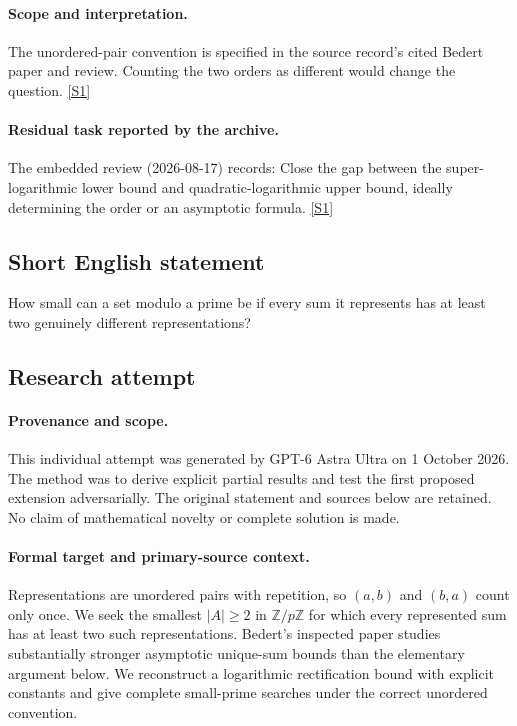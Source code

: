 \documentclass[11pt,a4paper]{article}
\newcommand{\Z}{\mathbb{Z}}
\newcommand{\sref}[2]{\hyperlink{source:#1:#2}{[S#2]}}
\begin{document}
\paragraph{Scope and interpretation.}

The unordered-pair convention is specified in the source record’s cited Bedert paper and review. Counting the two orders as different would change the question. \sref{158}{1}

\paragraph{Residual task reported by the archive.}

The embedded review (2026-08-17) records: Close the gap between the super-logarithmic lower bound and quadratic-logarithmic upper bound, ideally determining the order or an asymptotic formula. \sref{158}{1}

\subsection{Short English statement}

How small can a set modulo a prime be if every sum it represents has at least two genuinely different representations?

\subsection{Research attempt}

\paragraph{Provenance and scope.}
This individual attempt was generated by GPT-6 Astra Ultra on 1 October 2026. The method was to derive explicit partial results and test the first proposed extension adversarially. The original statement and sources below are retained. No claim of mathematical novelty or complete solution is made.

\paragraph{Formal target and primary-source context.}
Representations are unordered pairs with repetition, so $(a,b)$ and $(b,a)$ count only once. We seek the smallest $|A|\geq2$ in $\Z/p\Z$ for which every represented sum has at least two such representations. Bedert's inspected paper studies substantially stronger asymptotic unique-sum bounds than the elementary argument below. We reconstruct a logarithmic rectification bound with explicit constants and give complete small-prime searches under the correct unordered convention.
\end{document}
